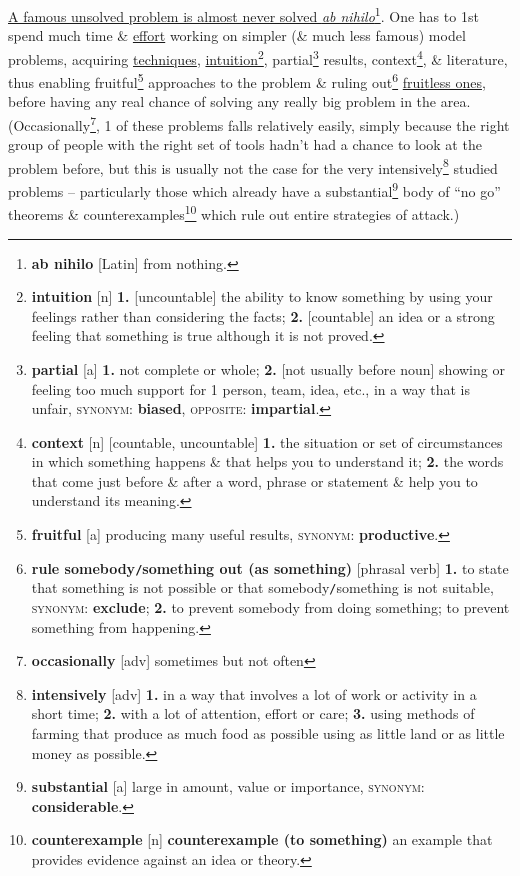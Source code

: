 \documentclass{article}
\numberwithin{equation}{section}
\begin{document}
\href{https://terrytao.wordpress.com/career-advice/dont-prematurely-obsess-on-a-single-big-problem-or-big-theory/}{A famous unsolved problem is almost never solved \textit{ab nihilo}}\footnote{\textbf{ab nihilo} [Latin] from nothing.}. One has to 1st spend much time \& \href{https://terrytao.wordpress.com/career-advice/work-hard/}{effort} working on simpler (\& much less famous) model problems, acquiring \href{https://terrytao.wordpress.com/career-advice/learn-the-power-of-other-mathematicians-tools/}{techniques}, \href{https://terrytao.wordpress.com/career-advice/there%E2%80%99s-more-to-mathematics-than-rigour-and-proofs/}{intuition}\footnote{\textbf{intuition} [n] \textbf{1.} [uncountable] the ability to know something by using your feelings rather than considering the facts; \textbf{2.} [countable] an idea or a strong feeling that something is true although it is not proved.}, partial\footnote{\textbf{partial} [a] \textbf{1.} not complete or whole; \textbf{2.} [not usually before noun] showing or feeling too much support for 1 person, team, idea, etc., in a way that is unfair, \textsc{synonym}: \textbf{biased}, \textsc{opposite}: \textbf{impartial}.} results, context\footnote{\textbf{context} [n] [countable, uncountable] \textbf{1.} the situation or set of circumstances in which something happens \& that helps you to understand it; \textbf{2.} the words that come just before \& after a word, phrase or statement \& help you to understand its meaning.}, \& literature, thus enabling fruitful\footnote{\textbf{fruitful} [a] producing many useful results, \textsc{synonym}: \textbf{productive}.} approaches to the problem \& ruling out\footnote{\textbf{rule somebody\texttt{/}something out (as something)} [phrasal verb] \textbf{1.} to state that something is not possible or that somebody\texttt{/}something is not suitable, \textsc{synonym}: \textbf{exclude}; \textbf{2.} to prevent somebody from doing something; to prevent something from happening.} \href{https://terrytao.wordpress.com/career-advice/learn-the-limitations-of-your-tools/}{fruitless ones}, before having any real chance of solving any really big problem in the area. (Occasionally\footnote{\textbf{occasionally} [adv] sometimes but not often}, 1 of these problems falls relatively easily, simply because the right group of people with the right set of tools hadn't had a chance to look at the problem before, but this is usually not the case for the very intensively\footnote{\textbf{intensively} [adv] \textbf{1.} in a way that involves a lot of work or activity in a short time; \textbf{2.} with a lot of attention, effort or care; \textbf{3.} using methods of farming that produce as much food as possible using as little land or as little money as possible.} studied problems -- particularly those which already have a substantial\footnote{\textbf{substantial} [a] large in amount, value or importance, \textsc{synonym}: \textbf{considerable}.} body of ``no go'' theorems \& counterexamples\footnote{\textbf{counterexample} [n] \textbf{counterexample (to something)} an example that provides evidence against an idea or theory.} which rule out entire strategies of attack.)
\end{document}
